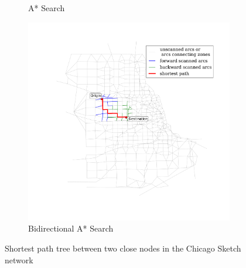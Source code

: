 \begin{figure}[H]
\begin{subfigure}{.5\textwidth}
        \caption{A* Search}
        \label{fig:chicago_astar2}
    \end{subfigure}%
    \begin{subfigure}{.5\textwidth}
        \centering
        \includegraphics[width=\textwidth,trim=120px 120px 48px 0px,clip]{img/chicago_astar_bidirect2}
        \caption{Bidirectional A* Search}
        \label{fig:chicago_astar_bidirect2}
    \end{subfigure}
    \vspace{1em}
    \caption{Shortest path tree between two close nodes in the Chicago Sketch network}
    \label{fig:short_sptree}
\end{figure}

